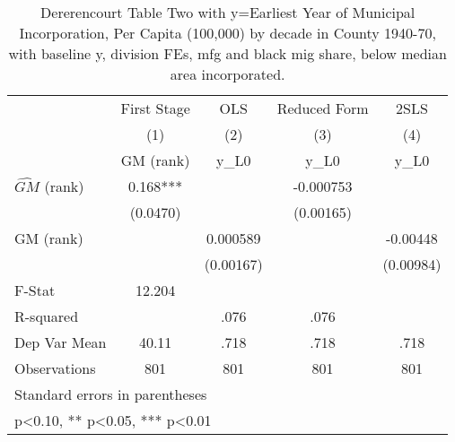 \begin{table}[htbp]\centering
\def\sym#1{\ifmmode^{#1}\else\(^{#1}\)\fi}
\caption{Dererencourt Table Two with y=Earliest Year of Municipal Incorporation, Per Capita (100,000) by decade in County 1940-70, with baseline y, division FEs, mfg and black mig share, below median area incorporated.}
\begin{tabular}{l*{4}{c}}
\toprule
                    & First Stage   &         OLS   &Reduced Form   &        2SLS   \\
                    &\multicolumn{1}{c}{(1)}&\multicolumn{1}{c}{(2)}&\multicolumn{1}{c}{(3)}&\multicolumn{1}{c}{(4)}\\
                    &\multicolumn{1}{c}{GM  (rank)}&\multicolumn{1}{c}{y\_L0}&\multicolumn{1}{c}{y\_L0}&\multicolumn{1}{c}{y\_L0}\\
\midrule
$\hat{GM}$ (rank)   &       0.168***&               &   -0.000753   &               \\
                    &    (0.0470)   &               &   (0.00165)   &               \\
\addlinespace
GM  (rank)          &               &    0.000589   &               &    -0.00448   \\
                    &               &   (0.00167)   &               &   (0.00984)   \\
\midrule
F-Stat              &      12.204   &               &               &               \\
R-squared           &               &        .076   &        .076   &               \\
Dep Var Mean        &       40.11   &        .718   &        .718   &        .718   \\
Observations        &         801   &         801   &         801   &         801   \\
\bottomrule
\multicolumn{5}{l}{\footnotesize Standard errors in parentheses}\\
\multicolumn{5}{l}{\footnotesize * p<0.10, ** p<0.05, *** p<0.01}\\
\end{tabular}
\end{table}
